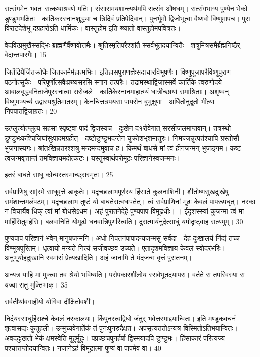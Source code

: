   सत्संगमेन भवतः सत्कथाश्रवणे मतिः।
 संसारामयशान्त्यर्थमपि सत्संग औषधम्।
 सत्संगभाग्य पुण्येन भेको डुण्डुभभक्षितः।
 कार्तिकस्स्नानशुद्ध्या च त्रिदिवं प्रतिपेदिवान्।
 पुनर्भूमौ द्विजोभूत्वा वैष्णवो विष्णुमापच।
 पुरा विराटदेशेभू दग्रहारोऽति धार्मिकः।
 वास्तुहोम इति ख्यातो वास्तुहोमपवित्रतः।
 
वेदवित्प्रमुखैस्सद्भिः ब्राह्मणैर्वैष्णवोत्तमैः।
 श्रुतिस्मृतिपरैश्शांतै स्सर्वभूतदयान्वितैः।
 शत्रुमित्रसमैर्ब्रह्मनिष्ठैर् वेदान्तपारगैः।
 15

  जितेंद्रियैर्जितक्रोधैः जितकामैर्महात्मभिः।
 इतिहासपुराणज्ञैःसदाचारविभूषणैः।
 विष्णुपूजापरैर्विष्णुपुराण पठनोत्सुकैः।
 परिपूर्णोत्सवैःप्रख्यसरसि स्नान तत्परैः।
 तद्रामस्थाद्विजास्सर्वे कार्तिके त्वरुणोदये।
 आबालवृद्धवनिताजेपुस्स्नात्वा सरोजले।
 कार्तिकेस्नानमाहात्म्यं धात्रीच्छायां समाश्रिताः।
 अशृण्वन् विष्णुमभ्यर्च्य उद्वास्यश्रुतिमातरम्।
 केनचित्तत्रपयसा पायसेन बुभुक्षुणा।
 अर्धितोनुदूतो भीत्या निपपातद्विजाग्रतः।
 20

  उत्प्लुत्योत्प्लुत्य सहसा स्पृष्ट्वा पादं द्विजस्यच।
 दुःखेन द१रोवेगात् सरसीजलमाप्तवान्।
 तत्रस्थो डुण्डुभःकश्चिजिघांसुःपादमग्रहीत्।
 दष्टोडुण्डुभदन्तेन चुक्रोशभृशमातुरः।
 निमज्जन्नुत्पतंश्चापि ग्रस्तोसौ भुजगास्यगः।
 श्रांतःखिन्नतरश्शत्रु मन्दमन्दमुवाच ह।
 किमर्थं बाधसे मां त्वं हीनजन्मन् भुजङ्गम।
 कष्टं त्वजन्मवृत्तान्तं तमविज्ञायमदोत्कटः।
 यस्तुस्वार्थपरोमूढः परिज्ञानेस्वजन्मनः।
 
इतरं बाधते साधू कोन्यस्तस्माच्छ्सस्मृतः।
 25

  सर्वप्राणिषु सा|स्मे साधुवृत्ते डाकृतेः।
 यदृच्छालाभपूर्णस्य हिंसाते कुलनाशिनी।
 शीतोष्णसुखदुःखेषु समंशान्तमलंपटम्।
 यदृच्छालाभ तुष्टं यो बाधतेसत्वधःपतेत्।
 त्वं सर्वप्राणिनां मूढः केवलं पापरूपधृत्।
 नरका न विचार्यैव धिक् त्वां मां बोधसेऽधम।
 अहं पुरातनेदेहे पुण्यपाप विमूढधीः।
 ।
 ईदृशस्स्यां कुजन्मा त्वं मा माहिंसितुमर्हसि।
 बलवानिति योमूढो धनवान्निपुणस्त्विति।
 दुरात्मायंनुदेत्साधुं यमोदृष्ट्वाह सत्यमुम्।
 30

  पुण्यपाप परिज्ञानं भवेन् मानुषजन्मनि।
 अधो निपतनंपापादन्यजन्मसु सर्वदा।
 देहं दुःखालयं निंद्यं तच्च विण्मूत्रपूरितम्।
 धृत्वायो मन्यते नित्यं सजीवच्छव उच्यते।
 एतादृशमविज्ञाय केवलं स्वोदरंभरिः।
 अनुभूयोहदुःखानि स्वमांसं प्रेत्यखादिति।
 अहं जानामि ते मंदजन्म वृत्तं पुरातनम्।
 
अन्यत्र याहि मां मुक्त्वा तव श्रेयो भविष्यति।
 परोपकारशीलोय स्सर्वभूतदयापरः।
 वर्तते स तपस्विस्या स यज्वा सतु मुक्तिभाक्।
 35

  सर्वतीर्थावगाहीयो योगिवा दीक्षितोवशी।
 
निर्दयस्साधुहिंसश्चे केवलं नरकालयः।
 किंपुनस्त्वद्विधो जंतुर् भवेत्तस्माद्दयान्वितः।
 इति मण्डूकवचनं शृत्वासद्यः कुतूहली।
 उन्मुच्यवेगातेंकं तं पुनःपुनरुदैक्षत।
 अपसृत्यततोऽन्यत्र विस्मितोऽतिभयान्वितः।
 अवददुःखतो भेकं क्षमस्वेति मुहुर्मुहुः।
 पप्रच्छचपुनर्हर्षा द्विस्मयादपि डुण्डुभः।
 हिंसाकारं परित्यज्य पश्चात्तप्तोदयान्वितः।
 नजानेऽहं विमूढात्मा पुण्यं वा पापमेव वा।
 40

